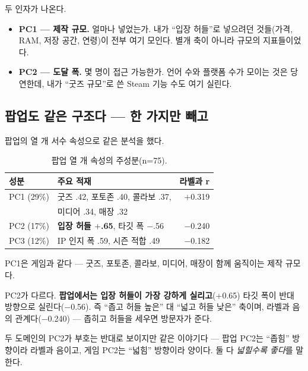 \documentclass[10pt]{article}
\begin{document}
두 인자가 나온다.

\begin{itemize}[leftmargin=1.1em,itemsep=0.15em]
\item \textbf{PC1 --- 제작 규모.} 얼마나 넣었는가. 내가 ``입장 허들''로 넣으려던
      것들(가격, RAM, 저장 공간, 연령)이 전부 여기 모인다. 별개 축이 아니라
      규모의 지표들이었다.
\item \textbf{PC2 --- 도달 폭.} 몇 명이 접근 가능한가. 언어 수와 플랫폼 수가
      모이는 것은 당연한데, 내가 ``굿즈 규모''로 쓴 Steam 기능 수도 여기 실린다.
\end{itemize}

\subsection{팝업도 같은 구조다 --- 한 가지만 빼고}

팝업의 열 개 서수 속성으로 같은 분석을 했다.

\begin{table}[t]
\centering\tsize
\caption{팝업 열 개 속성의 주성분(n=75).}
\begin{tabular}{llr}
\toprule
성분 & 주요 적재 & 라벨과 r \\
\midrule
PC1 (29\%) & 굿즈 .42, 포토존 .40, 콜라보 .37, & $+$0.319 \\
 & 미디어 .34, 매장 .32 & \\
PC2 (17\%) & \textbf{입장 허들 $+$.65}, 타깃 폭 $-$.56 & $-$0.240 \\
PC3 (12\%) & IP 인지 폭 .59, 시즌 적합 .49 & $-$0.182 \\
\bottomrule
\end{tabular}
\end{table}

PC1은 게임과 같다 --- 굿즈, 포토존, 콜라보, 미디어, 매장이 함께 움직이는
제작 규모다.

PC2가 다르다. \textbf{팝업에서는 입장 허들이 가장 강하게 실리고}(+0.65) 타깃 폭이
반대 방향으로 실린다($-$0.56). 즉 ``좁고 허들 높은'' 대 ``넓고 허들 낮은'' 축이며,
라벨과 음의 관계다($-$0.240) --- 좁히고 허들을 세우면 방문자가 준다.


두 도메인의 PC2가 부호는 반대로 보이지만 같은 이야기다 --- 팝업 PC2는 ``좁힘''
방향이라 라벨과 음이고, 게임 PC2는 ``넓힘'' 방향이라 양이다. 둘 다 \emph{넓힐수록
좋다}를 말한다.
\end{document}

